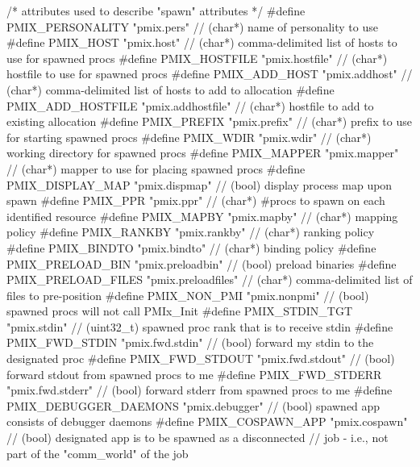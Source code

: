 \begin{codepar}
/* attributes used to describe "spawn" attributes */
#define PMIX_PERSONALITY                    "pmix.pers"             // (char*) name of personality to use
#define PMIX_HOST                           "pmix.host"             // (char*) comma-delimited list of hosts to use for spawned procs
#define PMIX_HOSTFILE                       "pmix.hostfile"         // (char*) hostfile to use for spawned procs
#define PMIX_ADD_HOST                       "pmix.addhost"          // (char*) comma-delimited list of hosts to add to allocation
#define PMIX_ADD_HOSTFILE                   "pmix.addhostfile"      // (char*) hostfile to add to existing allocation
#define PMIX_PREFIX                         "pmix.prefix"           // (char*) prefix to use for starting spawned procs
#define PMIX_WDIR                           "pmix.wdir"             // (char*) working directory for spawned procs
#define PMIX_MAPPER                         "pmix.mapper"           // (char*) mapper to use for placing spawned procs
#define PMIX_DISPLAY_MAP                    "pmix.dispmap"          // (bool) display process map upon spawn
#define PMIX_PPR                            "pmix.ppr"              // (char*) #procs to spawn on each identified resource
#define PMIX_MAPBY                          "pmix.mapby"            // (char*) mapping policy
#define PMIX_RANKBY                         "pmix.rankby"           // (char*) ranking policy
#define PMIX_BINDTO                         "pmix.bindto"           // (char*) binding policy
#define PMIX_PRELOAD_BIN                    "pmix.preloadbin"       // (bool) preload binaries
#define PMIX_PRELOAD_FILES                  "pmix.preloadfiles"     // (char*) comma-delimited list of files to pre-position
#define PMIX_NON_PMI                        "pmix.nonpmi"           // (bool) spawned procs will not call PMIx_Init
#define PMIX_STDIN_TGT                      "pmix.stdin"            // (uint32_t) spawned proc rank that is to receive stdin
#define PMIX_FWD_STDIN                      "pmix.fwd.stdin"        // (bool) forward my stdin to the designated proc
#define PMIX_FWD_STDOUT                     "pmix.fwd.stdout"       // (bool) forward stdout from spawned procs to me
#define PMIX_FWD_STDERR                     "pmix.fwd.stderr"       // (bool) forward stderr from spawned procs to me
#define PMIX_DEBUGGER_DAEMONS               "pmix.debugger"         // (bool) spawned app consists of debugger daemons
#define PMIX_COSPAWN_APP                    "pmix.cospawn"          // (bool) designated app is to be spawned as a disconnected
                                                                    //        job - i.e., not part of the "comm_world" of the job

\end{codepar}
